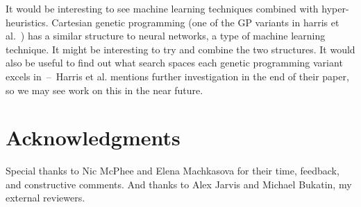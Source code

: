 \documentclass{sig-alternate}
\begin{document}
It would be interesting to see machine learning techniques combined with hyper-heuristics. Cartesian genetic programming (one of the GP variants in harris et al.~\cite{harris:2015}) has a similar structure to neural networks, a type of machine learning technique. It might be interesting to try and combine the two structures. It would also be useful to find out what search spaces each genetic programming variant excels in~--~Harris et al. mentions further investigation in the end of their paper, so we may see work on this in the near future.

\section*{Acknowledgments}
\label{sec:acknowledgments}
Special thanks to Nic McPhee and Elena Machkasova for their time, feedback, and constructive comments. And thanks to Alex Jarvis and Michael Bukatin, my external reviewers.

  
\end{document}
